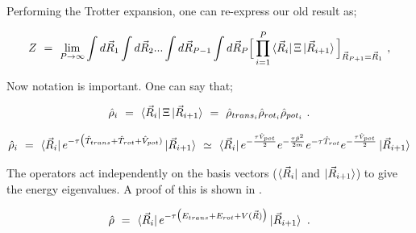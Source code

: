 \documentclass{ece}
\begin{document}
Performing the Trotter expansion, one can re-express our old result as;

\begin{equation} \label{eq:53}
Z \hspace{0.125cm} = \hspace{0.125cm}  \lim_{P \rightarrow \infty} \int d \vec{R}_1 \int d \vec{R}_2 ... \int d \vec{R}_{P - 1} \int d \vec{R}_P \Big[ \prod_{i=1}^{P} \bra{\vec{R}_i} \Xi \ket{\vec{R}_{i+1}} \Big]_{\vec{R}_{P+1} = \vec{R}_1} \hspace{0.125cm} , 
\end{equation}

Now notation is important. One can say that;

\begin{equation} \label{eq:54}
\hat{\rho}_i \hspace{0.125cm} = \hspace{0.125cm} \bra{\vec{R}_i} \Xi \ket{\vec{R}_{i+1}} \hspace{0.125cm} = \hspace{0.125cm} \hat{\rho}_{trans_i} \hat{\rho}_{rot_i} \hat{\rho}_{pot_i} \hspace{0.125cm} . 
\end{equation}

\begin{equation} \label{eq:56}
\hat{\rho}_i \hspace{0.125cm} = \hspace{0.125cm} \bra{\vec{R}_i} e^{ - \tau \big( \hat{T}_{trans} + \hat{T}_{rot} + \hat{V}_{pot} ) } \ket{\vec{R}_{i+1}}  \hspace{0.125cm} \simeq \hspace{0.125cm} \bra{\vec{R}_{i}} e^{- \frac{ \tau \hat{V}_{pot}}{2}} e^{- \frac{\tau \hat{p}^2}{2 m}} e^{-\tau \hat{T}_{rot}} e^{- \frac{ \tau \hat{V}_{pot}}{2}}  \ket{\vec{R}_{i+1}}
\end{equation}

The operators act independently on the basis vectors (\begin{math} \bra{\vec{R}_i} \end{math} and \begin{math} \ket{\vec{R}_{i+1}} \end{math}) to give the energy eigenvalues. A proof of this is shown in .

\begin{equation} \label{eq:57}
\hat{\rho} \hspace{0.125cm} = \hspace{0.125cm} \bra{\vec{R}_i} e^{ - \tau \big( E_{trans} + E_{rot} + V(\vec{R})\big) } \ket{\vec{R}_{i+1}} \hspace{0.125cm} .
\end{equation}
\end{document}
